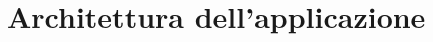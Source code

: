 \documentclass[../DefinizioneDiProdotto.tex]{subfiles}
\begin{document}
		\section{Architettura dell'applicazione}
\end{document}
